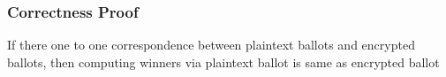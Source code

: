 \documentclass{beamer}
\begin{document}
%
%
%
%
%
%


\begin{frame}
\frametitle{Correctness Proof} 
If there one to one correspondence between plaintext ballots 
and encrypted ballots, then computing winners via 
plaintext ballot is same as encrypted ballot
\proofcorrectness
\end{frame}
\end{document}
